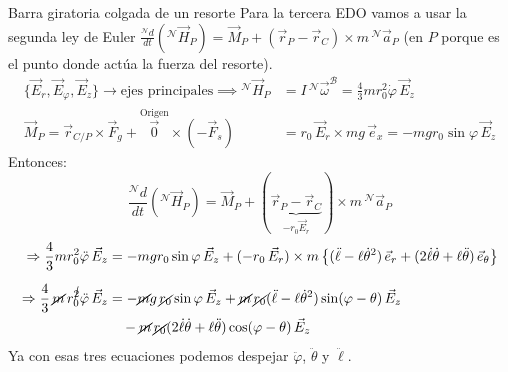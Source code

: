 \begin{solucion}{Barra giratoria colgada de un resorte}
Para la tercera EDO vamos a usar la segunda ley de Euler
$\frac{{}^{\mathcal{N}} d}{dt} ({}^{\mathcal{N}}\vec{H}_P) = \vec{M}_P + (\vec{r}_P - \vec{r}_C) \times m\, {}^{\mathcal{N}}\vec{a}_P$
(en $P$ porque es el punto donde actúa la fuerza del resorte).
\begin{align*}
\{ \vec{E}_r, \vec{E}_\varphi, \vec{E}_z \} \rightarrow \text{ejes principales} \implies {}^{\mathcal{N}}\vec{H}_P &= I\, {}^{\mathcal{N}}\vec{\omega}^{\mathcal{B}} = \frac{4}{3} m r_0^2 \dot{\varphi}\, \vec{E}_z \\
\vec{M}_P = \vec{r}_{C/P} \times \vec{F}_g + \overset{\text{Origen}}{\vec{0}} \times (-\vec{F}_s) &= r_0\, \vec{E}_r \times mg\, \vec{e}_x = -mg r_0 \sin\varphi\, \vec{E}_z
\end{align*}
Entonces:
\begin{equation*}
\frac{{}^{\mathcal{N}} d}{dt} ({}^{\mathcal{N}}\vec{H}_P) = \vec{M}_P + (\underbrace{\vec{r}_P - \vec{r}_C}_{-r_0 \vec{E}_r}) \times m\, {}^{\mathcal{N}}\vec{a}_P
\end{equation*}
\begin{align*}
\Rightarrow \frac{4}{3} m r_0^2 \ddot{\varphi}\, \vec{E}_z &= -mg r_0 \sin\varphi\, \vec{E}_z + (-r_0\, \vec{E}_r) \times m \left\{ (\ddot{\ell} - \ell\dot{\theta}^2)\, \vec{e}_r + (2\dot{\ell}\dot{\theta} + \ell\ddot{\theta})\, \vec{e}_\theta \right\} \\[6pt]
\Rightarrow \frac{4}{3}\, \cancel{m}\, r_0^{\cancel{2}} \ddot{\varphi}\, \vec{E}_z &= -\cancel{m}g\, \cancel{r_0} \sin\varphi\, \vec{E}_z + \cancel{m}\,\cancel{r_0} (\ddot{\ell} - \ell\dot{\theta}^2) \sin(\varphi - \theta)\, \vec{E}_z \\
& \quad - \cancel{m}\,\cancel{r_0} (2\dot{\ell}\dot{\theta} + \ell\ddot{\theta}) \cos(\varphi - \theta)\, \vec{E}_z
\end{align*}
Ya con esas tres ecuaciones podemos despejar $\ddot\varphi$, $\ddot\theta$ y $\ddot\ell$.
\end{solucion}
